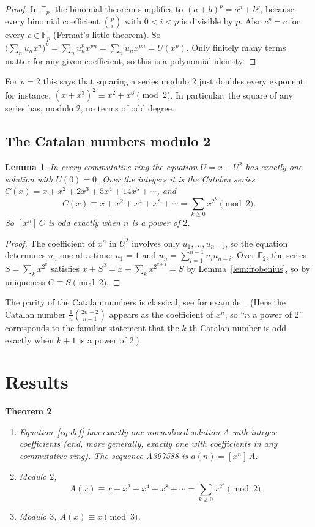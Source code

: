 \documentclass[11pt,a4paper]{article}
\newtheorem{theorem}{Theorem}[section]
\newtheorem{lemma}[theorem]{Lemma}
\theoremstyle{definition}
\theoremstyle{remark}
\newcommand{\F}{\mathbb{F}}
\newcommand{\coeff}[2]{[x^{#1}]\,#2}
\begin{document}
\begin{proof}
In $\F_p$, the binomial theorem simplifies to $(a+b)^p=a^p+b^p$, because every binomial coefficient
$\binom pi$ with $0<i<p$ is divisible by $p$. Also $c^p=c$ for every $c\in\F_p$ (Fermat's little theorem). So
$\bigl(\sum_nu_nx^n\bigr)^p=\sum_nu_n^px^{pn}=\sum_nu_nx^{pn}=U(x^p)$. Only finitely many terms matter for any given
coefficient, so this is a polynomial identity.
\end{proof}

For $p=2$ this says that squaring a series modulo $2$ just doubles every exponent: for instance,
$(x+x^3)^2\equiv x^2+x^6\pmod2$. In particular, the square of any series has, modulo $2$, no terms of odd degree.

\subsection{The Catalan numbers modulo 2}
\begin{lemma}\label{lem:catalan}
In every commutative ring the equation $U=x+U^2$ has exactly one solution with $U(0)=0$. Over the integers it is the
Catalan series $C(x)=x+x^2+2x^3+5x^4+14x^5+\cdots$, and
\[
C(x)\equiv x+x^2+x^4+x^8+\cdots=\sum_{k\ge0}x^{2^k}\pmod 2 .
\]
So $\coeff{n}{C}$ is odd exactly when $n$ is a power of $2$.
\end{lemma}

\begin{proof}
The coefficient of $x^n$ in $U^2$ involves only $u_1,\dots,u_{n-1}$, so the equation determines $u_n$ one at a time:
$u_1=1$ and $u_n=\sum_{i=1}^{n-1}u_iu_{n-i}$. Over $\F_2$, the series $S=\sum_kx^{2^k}$ satisfies
$x+S^2=x+\sum_kx^{2^{k+1}}=S$ by Lemma~\ref{lem:frobenius}, so by uniqueness $C\equiv S\pmod2$.
\end{proof}
The parity of the Catalan numbers is classical; see for example~\cite{deutschsagan}. (Here the Catalan number
$\frac1{n}\binom{2n-2}{n-1}$ appears as the coefficient of $x^n$, so ``$n$ a power of $2$'' corresponds to the familiar
statement that the $k$-th Catalan number is odd exactly when $k+1$ is a power of $2$.)


\section{Results}\label{sec:results}

\begin{theorem}\label{thm:main}
\begin{enumerate}[label=(\alph*)]
\item Equation~\eqref{eq:def} has exactly one normalized solution $A$ with integer coefficients (and, more generally,
exactly one with coefficients in any commutative ring). The sequence A397588 is $a(n)=\coeff{n}{A}$.
\item Modulo $2$,
\[
A(x)\equiv x+x^2+x^4+x^8+\cdots=\sum_{k\ge0}x^{2^k}\pmod 2 .
\]
\item Modulo $3$, $A(x)\equiv x\pmod3$.
\end{enumerate}
\end{theorem}
\end{document}
